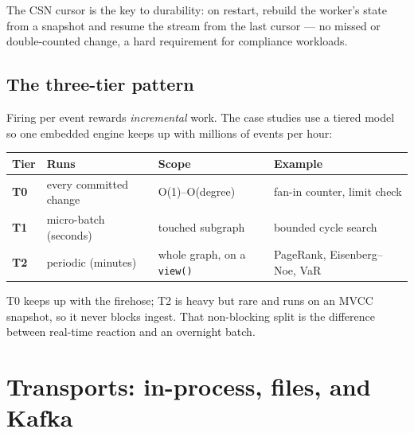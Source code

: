 \documentclass[
  11pt,
  openany]{book}
\begin{document}
The CSN cursor is the key to durability: on restart, rebuild the
worker's state from a snapshot and resume the stream from the last
cursor --- no missed or double-counted change, a hard requirement for
compliance workloads.

\subsection{The three-tier pattern}\label{the-three-tier-pattern}

Firing per event rewards \emph{incremental} work. The case studies use a
tiered model so one embedded engine keeps up with millions of events per
hour:

\begin{longtable}[]{@{}
  >{\raggedright\arraybackslash}p{}
  >{\raggedright\arraybackslash}p{}
  >{\raggedright\arraybackslash}p{}
  >{\raggedright\arraybackslash}p{}@{}}
\toprule\noalign{}
\begin{minipage}[b]{\linewidth}\raggedright
Tier
\end{minipage} & \begin{minipage}[b]{\linewidth}\raggedright
Runs
\end{minipage} & \begin{minipage}[b]{\linewidth}\raggedright
Scope
\end{minipage} & \begin{minipage}[b]{\linewidth}\raggedright
Example
\end{minipage} \\
\midrule\noalign{}
\endhead
\bottomrule\noalign{}
\endlastfoot
\textbf{T0} & every committed change & O(1)--O(degree) & fan-in counter,
limit check \\
\textbf{T1} & micro-batch (seconds) & touched subgraph & bounded cycle
search \\
\textbf{T2} & periodic (minutes) & whole graph, on a \texttt{view()} &
PageRank, Eisenberg--Noe, VaR \\
\end{longtable}

T0 keeps up with the firehose; T2 is heavy but rare and runs on an MVCC
snapshot, so it never blocks ingest. That non-blocking split is the
difference between real-time reaction and an overnight batch.

\section{Transports: in-process, files, and
Kafka}\label{transports-in-process-files-and-kafka}
\end{document}
